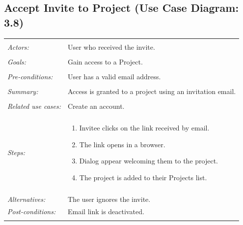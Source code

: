 \documentclass[11pt]{report}
\begin{document}
\subsection{Accept Invite to Project (Use Case Diagram: 3.8)}
\begin{tabular}{ p{2cm} p{12cm} }   
 \hline
 \\
 \textit{Actors:} & User who received the invite. \\
 \\
 \textit{Goals:} & Gain access to a Project. \\
 \\
 \textit{Pre-conditions:} & User has a valid email address. \\
 \\
 \textit{Summary:} & Access is granted to a project using an invitation email. \\ 
 \\
 \textit{Related use cases:} & Create an account. \\
 \\
 \textit{Steps:} & \begin{enumerate}
  \item Invitee clicks on the link received by email.
	 \item The link opens in a browser.
	 \item Dialog appear welcoming them to the project.
	 \item The project is added to their Projects list.
	\end{enumerate} \\
 \\
 \textit{Alternatives:} & The user ignores the invite. \\
 \textit{Post-conditions:} & Email link is deactivated. \\
 \\
\hline
\end{tabular}
\end{document}
